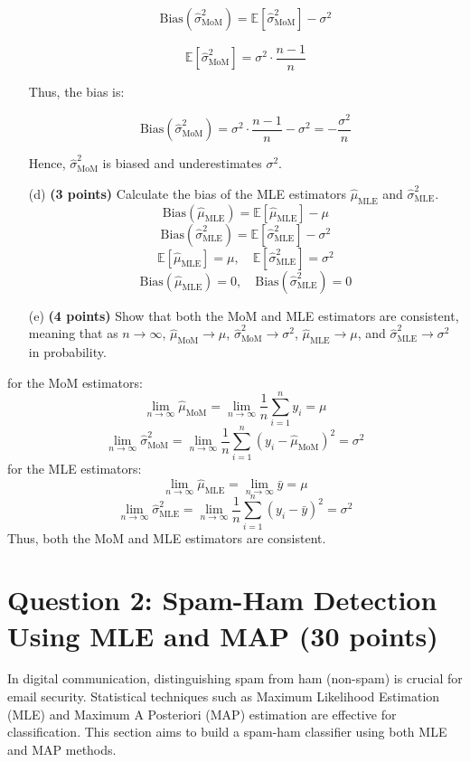 \documentclass{article}
\begin{document}
\begin{enumerate}
\[
\text{Bias}(\hat{\sigma}^2_{\text{MoM}}) = \mathbb{E}[\hat{\sigma}^2_{\text{MoM}}] - \sigma^2
\]


\[
\mathbb{E}[\hat{\sigma}^2_{\text{MoM}}] = \sigma^2 \cdot \frac{n-1}{n}
\]

Thus, the bias is:

\[
\text{Bias}(\hat{\sigma}^2_{\text{MoM}}) = \sigma^2 \cdot \frac{n-1}{n} - \sigma^2 = -\frac{\sigma^2}{n}
\]

Hence, \( \hat{\sigma}^2_{\text{MoM}} \) is biased and underestimates \( \sigma^2 \).

\item[(d)] \textbf{(3 points)} Calculate the bias of the MLE estimators \(\hat{\mu}_{\text{MLE}}\) and \(\hat{\sigma}^2_{\text{MLE}}\).
\[
\text{Bias}(\hat{\mu}_{\text{MLE}}) = \mathbb{E}[\hat{\mu}_{\text{MLE}}] - \mu
\]
\[
\text{Bias}(\hat{\sigma}^2_{\text{MLE}}) = \mathbb{E}[\hat{\sigma}^2_{\text{MLE}}] - \sigma^2
\]
\[
\mathbb{E}[\hat{\mu}_{\text{MLE}}] = \mu, \quad \mathbb{E}[\hat{\sigma}^2_{\text{MLE}}] = \sigma^2
\]
\[
\text{Bias}(\hat{\mu}_{\text{MLE}}) = 0, \quad \text{Bias}(\hat{\sigma}^2_{\text{MLE}}) = 0
\]
    \item[(e)] \textbf{(4 points)} Show that both the MoM and MLE estimators are consistent, meaning that as \(n \to \infty\), \(\hat{\mu}_{\text{MoM}} \to \mu\), \(\hat{\sigma}^2_{\text{MoM}} \to \sigma^2\), \(\hat{\mu}_{\text{MLE}} \to \mu\), and \(\hat{\sigma}^2_{\text{MLE}} \to \sigma^2\) in probability.
\end{enumerate}
for the MoM estimators:
\[
\lim_{n \to \infty} \hat{\mu}_{\text{MoM}} = \lim_{n \to \infty} \frac{1}{n} \sum_{i=1}^n y_i = \mu
\]
\[
\lim_{n \to \infty} \hat{\sigma}^2_{\text{MoM}} = \lim_{n \to \infty} \frac{1}{n} \sum_{i=1}^n (y_i - \hat{\mu}_{\text{MoM}})^2 = \sigma^2
\]
for the MLE estimators:
\[
\lim_{n \to \infty} \hat{\mu}_{\text{MLE}} = \lim_{n \to \infty} \bar{y} = \mu
\]
\[
\lim_{n \to \infty} \hat{\sigma}^2_{\text{MLE}} = \lim_{n \to \infty} \frac{1}{n} \sum_{i=1}^n (y_i - \bar{y})^2 = \sigma^2
\]
Thus, both the MoM and MLE estimators are consistent.
    
  








\section*{Question 2: Spam-Ham Detection Using MLE and MAP (30 points)}
In digital communication, distinguishing spam from ham (non-spam) is crucial for email security. Statistical techniques such as Maximum Likelihood Estimation (MLE) and Maximum A Posteriori (MAP) estimation are effective for classification. This section aims to build a spam-ham classifier using both MLE and MAP methods.
\end{document}
